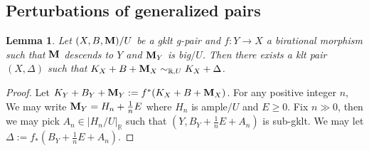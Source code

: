 \documentclass[11pt]{amsart}
\numberwithin{equation}{section}
\newcommand{\Mm}{{\bf{M}}}
\newtheorem{lem}[thm]{Lemma}
\theoremstyle{definition}
\theoremstyle{definition}
\theoremstyle{definition}
\begin{document}
\subsection{Perturbations of generalized pairs}

\begin{lem}\label{lem: gklt g-pair to pair}
  Let $(X,B,\Mm)/U$ be a gklt g-pair and $f: Y\rightarrow X$ a
  birational morphism such that $\Mm$ descends to $Y$ and $\Mm_Y$ is
  big$/U$. Then there exists a klt pair $(X,\Delta)$ such that
  $K_X+B+\Mm_X\sim_{\mathbb R,U}K_X+\Delta$.
\end{lem}
\begin{proof}
  Let $K_Y+B_Y+\Mm_Y:=f^*(K_X+B+\Mm_X)$. For any positive integer
  $n$, We may write $\Mm_Y=H_n+\frac{1}{n}E$ where $H_n$ is ample$/U$
  and $E\geq 0$. Fix $n\gg 0$, then we may pick $A_n\in
  |H_n/U|_{\mathbb R}$ such that $(Y,B_Y+\frac{1}{n}E+A_n)$ is
  sub-gklt. We may let $\Delta:=f_*(B_Y+\frac{1}{n}E+A_n)$.
\end{proof}
\end{document}
